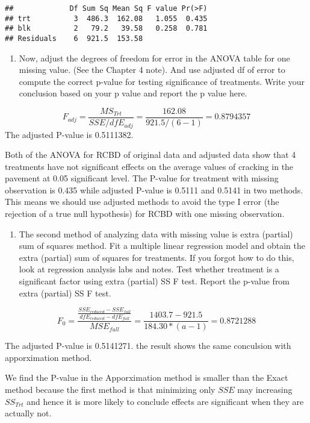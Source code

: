 \documentclass[]{article}
\providecommand{\tightlist}{%
  \setlength{\itemsep}{0pt}\setlength{\parskip}{0pt}}
\begin{document}
\begin{verbatim}
##             Df Sum Sq Mean Sq F value Pr(>F)
## trt          3  486.3  162.08   1.055  0.435
## blk          2   79.2   39.58   0.258  0.781
## Residuals    6  921.5  153.58
\end{verbatim}

\begin{enumerate}
\def\labelenumi{(\alph{enumi})}
\setcounter{enumi}{5}
\tightlist
\item
  Now, adjust the degrees of freedom for error in the ANOVA table for
  one missing value. (See the Chapter 4 note). And use adjusted df of
  error to compute the correct p-value for testing significance of
  treatments. Write your conclusion based on your p value and report the
  p value here.
\end{enumerate}

\[F_{adj}=\frac{MS_{Trt}}{SSE/dfE_{adj}}=\frac{162.08}{921.5/(6-1)}=0.8794357\]
The adjusted P-value is 0.5111382.

Both of the ANOVA for RCBD of original data and adjusted data show that
4 treatments have not significant effects on the average values of
cracking in the pavement at 0.05 significant level. The P-value for
treatment with missing observation is 0.435 while adjusted P-value is
0.5111 and 0.5141 in two methods. This means we should use adjusted
methods to avoid the type I error (the rejection of a true null
hypothesis) for RCBD with one missing observation.

\begin{enumerate}
\def\labelenumi{(\alph{enumi})}
\setcounter{enumi}{6}
\tightlist
\item
  The second method of analyzing data with missing value is extra
  (partial) sum of squares method. Fit a multiple linear regression
  model and obtain the extra (partial) sum of squares for treatments. If
  you forgot how to do this, look at regression analysis labs and notes.
  Test whether treatment is a significant factor using extra (partial)
  SS F test. Report the p-value from extra (partial) SS F test.
\end{enumerate}

\[F_0=\frac{\frac{SSE_{reduced}-SSE_{full}}{dfE_{reduced}-dfE_{full}}}{MSE_{full}}=\frac{1403.7-921.5}{184.30*(a-1)}=0.8721288\]

The adjusted P-value is 0.5141271. the result shows the same conculsion
with apporximation method.

We find the P-value in the Apporximation method is smaller than the
Exact method because the first method is that minimizing only \(SSE\)
may increasing \(SS_{Trt}\) and hence it is more likely to conclude
effects are significant when they are actually not.
\end{document}
